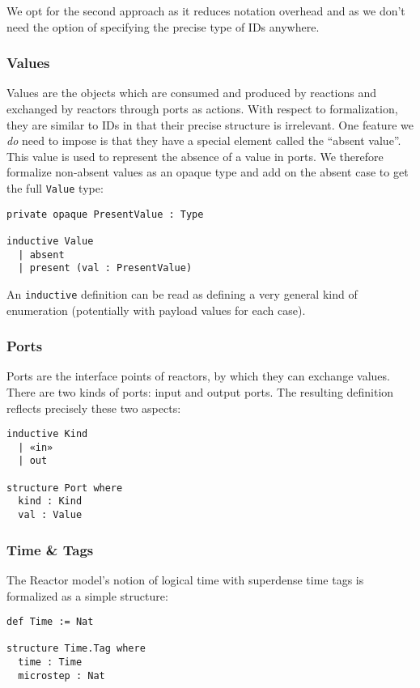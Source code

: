 We opt for the second approach as it reduces notation overhead and as we don't need the option of specifying the precise type of IDs anywhere.

\subsubsection{Values}

Values are the objects which are consumed and produced  by reactions and exchanged by reactors through ports as actions.
With respect to formalization, they are similar to IDs in that their precise structure is irrelevant.
One feature we \emph{do} need to impose is that they have a special element called the ``absent value''.
This value is used to represent the absence of a value in ports.
We therefore formalize non-absent values as an opaque type and add on the absent case to get the full \lstinline{Value} type:

\begin{lstlisting}
private opaque PresentValue : Type

inductive Value 
  | absent 
  | present (val : PresentValue)
\end{lstlisting}

An \lstinline{inductive} definition can be read as defining a very general kind of enumeration (potentially with payload values for each case).

\subsubsection{Ports}

Ports are the interface points of reactors, by which they can exchange values.
There are two kinds of ports: input and output ports.
The resulting definition reflects precisely these two aspects:

\begin{lstlisting}
inductive Kind
  | «in» 
  | out

structure Port where
  kind : Kind
  val : Value
\end{lstlisting}

\subsubsection{Time \& Tags}

The Reactor model's notion of logical time with superdense time tags is formalized as a simple structure:

\begin{lstlisting}
def Time := Nat

structure Time.Tag where 
  time : Time
  microstep : Nat
\end{lstlisting}

